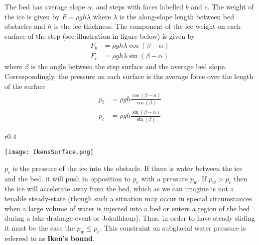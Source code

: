 \documentclass[12pt]{article}
\theoremstyle{definition}
\begin{document}
The bed has average slope $\alpha$, and steps with faces labelled $b$ and $c$. The weight of the ice is given by $F = \rho g h \lambda$ where $\lambda$ is the along-slope length between bed obstacles and $h$ is the ice thickness. The component of the ice weight on each surface of the step (see illustration in figure below) is given by
\begin{align}
F_b &= \rho g h \lambda \cos(\beta-\alpha) \\
F_c &= \rho g h \lambda \sin(\beta-\alpha)
\end{align}
where $\beta$ is the angle between the step surface and the average bed slope. Correspondingly, the pressure on each surface is the average force over the length of the surface
\begin{align}
p_b &= \rho g h \frac{\cos(\beta-\alpha)}{\cos(\beta)} \\
p_c &= \rho g h \frac{\sin(\beta-\alpha)}{\sin(\beta)}
\end{align}
\begin{wrapfigure}{r}{0.4\textwidth}
  \begin{center}
\texttt{[image: IkensSurface.png]}
  \end{center}
  \vspace{-20pt}
\end{wrapfigure}

$p_c$ is the pressure of the ice into the obstacle. If there is water between the ice and the bed, it will push in opposition to $p_c$ with a pressure $p_w$. If $p_w>p_c$ then the ice will accelerate away from the bed, which as we can imagine is not a tenable steady-state (though such a situation may occur in special circumstances when a large volume of water is injected into a bed or enters a region of the bed during a lake drainage event or Jokulhlaup). Thus, in order to have steady sliding it must be the case the $p_w \leq p_c$. This constraint on subglacial water pressure is referred to as \textbf{Iken's bound}. 
\end{document}
